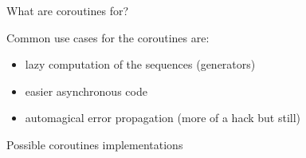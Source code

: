 \documentclass[10pt]{beamer}
\begin{document}
\begin{frame}{What are coroutines for?}
\centerline{Common use cases for the coroutines are:}
  
      \begin{itemize}
        \item lazy computation of the sequences (generators)
        \item easier asynchronous code
        \item automagical error propagation (more of a hack but still)
      \end{itemize}

  
\end{frame}


\begin{frame}{Possible coroutines implementations}
\begin{columns}[t]


\end{columns}
\end{frame}
\end{document}
